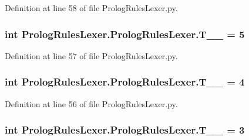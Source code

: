 Definition at line 58 of file Prolog\+Rules\+Lexer.\+py.

\hypertarget{class_prolog_rules_lexer_1_1_prolog_rules_lexer_af2e6d8f610c091ed1237a1036fa27cf5}{}
\subsubsection[{T\+\_\+\+\_\+4}]{\setlength{\rightskip}{0pt plus 5cm}int Prolog\+Rules\+Lexer.\+Prolog\+Rules\+Lexer.\+T\+\_\+\+\_ = 5\hspace{0.3cm}{\ttfamily [static]}}\label{class_prolog_rules_lexer_1_1_prolog_rules_lexer_af2e6d8f610c091ed1237a1036fa27cf5}


Definition at line 57 of file Prolog\+Rules\+Lexer.\+py.

\hypertarget{class_prolog_rules_lexer_1_1_prolog_rules_lexer_a0651d9aa3905f40e3e4efe27a2d0da3b}{}
\subsubsection[{T\+\_\+\+\_\+5}]{\setlength{\rightskip}{0pt plus 5cm}int Prolog\+Rules\+Lexer.\+Prolog\+Rules\+Lexer.\+T\+\_\+\+\_ = 4\hspace{0.3cm}{\ttfamily [static]}}\label{class_prolog_rules_lexer_1_1_prolog_rules_lexer_a0651d9aa3905f40e3e4efe27a2d0da3b}


Definition at line 56 of file Prolog\+Rules\+Lexer.\+py.

\hypertarget{class_prolog_rules_lexer_1_1_prolog_rules_lexer_a7918ad929c34481ba9c1fccf0dc2049b}{}
\subsubsection[{T\+\_\+\+\_\+6}]{\setlength{\rightskip}{0pt plus 5cm}int Prolog\+Rules\+Lexer.\+Prolog\+Rules\+Lexer.\+T\+\_\+\+\_ = 3\hspace{0.3cm}{\ttfamily [static]}}\label{class_prolog_rules_lexer_1_1_prolog_rules_lexer_a7918ad929c34481ba9c1fccf0dc2049b}


